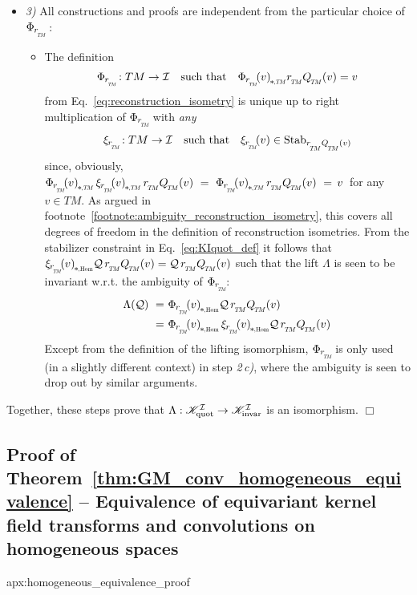 \begin{itemize}[leftmargin=0cm]
    \item[] {\emph{3)} All constructions and proofs are independent from the particular choice of $\PhirNoArg$ : }
    \begin{itemize}[leftmargin=1.1cm]
    \setlength\itemsep{2ex}
        \item[]%
            The definition
            \begin{align}
                \PhirNoArg: TM \to \I \quad \textup{such that}\quad \dPhirTM{v} \rTM \QTM(v) = v
            \end{align}
            from Eq.~\eqref{eq:reconstruction_isometry} is unique up to right multiplication of $\PhirNoArg$ with \emph{any}
            \begin{align}
                \xirNoArg: TM \to \I \quad \textup{such that}\quad \xir{v} \in \Stab{\rTM\QTM(v)}
            \end{align}
            since, obviously, $\dPhirTM{v}\, \dxirTM{v}\, \rTM\QTM(v)\ =\ \dPhirTM{v}\, \rTM\QTM(v)\ =\, v\,$ for any $v\in TM$.
            As argued in footnote~\ref{footnote:ambiguity_reconstruction_isometry}, this covers all degrees of freedom in the definition of reconstruction isometries.
            From the stabilizer constraint in Eq.~\eqref{eq:KIquot_def} it follows that $\dxirHom{v} \Q\, \rTM\QTM(v) = \Q\, \rTM\QTM(v)$ such that the lift $\Lambda$ is seen to be invariant w.r.t. the ambiguity of $\PhirNoArg$:
            \begin{align}
                \Lambda(\Q)
                \ =&\ \dPhirHom{v} \Q\, \rTM\QTM(v) \notag \\
                \ =&\ \dPhirHom{v}\, \dxirHom{v} \Q\, \rTM\QTM(v) \notag \\
            \end{align}
            Except from the definition of the lifting isomorphism, $\PhirNoArg$ is only used (in a slightly different context) in step \textit{2\,c)}, where the ambiguity is seen to drop out by similar arguments.

    \end{itemize}

\end{itemize}

\noindent Together, these steps prove that $\Lambda: \mathscr{K}_\textup{quot}^{\mathcal{I}} \to \mathscr{K}_\textup{invar}^{\mathcal{I}}$ is an isomorphism.
\hfill$\Box$







\toclesslab\subsection{Proof of Theorem~\ref{thm:GM_conv_homogeneous_equivalence} -- Equivalence of equivariant kernel field transforms and convolutions on homogeneous spaces}{apx:homogeneous_equivalence_proof}

